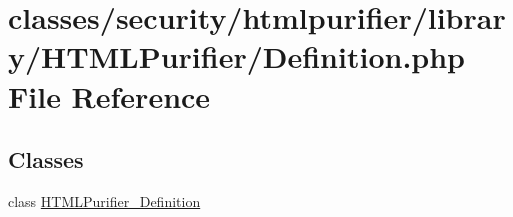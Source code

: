 \hypertarget{Definition_8php}{\section{classes/security/htmlpurifier/library/\+H\+T\+M\+L\+Purifier/\+Definition.php File Reference}
\label{Definition_8php}
}
\subsection*{Classes}
\begin{DoxyCompactItemize}
\item 
class \hyperlink{classHTMLPurifier__Definition}{H\+T\+M\+L\+Purifier\+\_\+\+Definition}
\end{DoxyCompactItemize}
